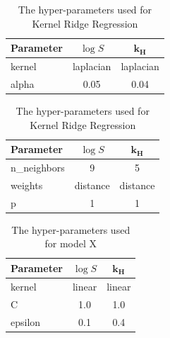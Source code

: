 \documentclass[11pt, titlepage]{article}
\begin{document}
\begin{table}[H]
	\begin{minipage}{.5\linewidth}
		\centering\small
		\begin{tabular}{|l|c|c|}
			\hline
			\textbf{Parameter} & $\log S$ & $\mathbf{k_H}$ \\
			\hline
			kernel & laplacian & laplacian\\
			alpha & 0.05 & 0.04\\
			\hline
		\end{tabular}
		\caption{The hyper-parameters used for Kernel Ridge Regression}
		\label{tab:KRR_params}
	\end{minipage}
	\begin{minipage}{.5\linewidth}
		\centering\small
		\begin{tabular}{|l|c|c|}
			\hline
			\textbf{Parameter} & $\log S$ & $\mathbf{k_H}$ \\
			\hline
			n\_neighbors & 9 & 5 \\
			weights & distance & distance \\
			p & 1 & 1\\
			\hline
		\end{tabular}
	\end{minipage}
\end{table}

\begin{table}[H]
	\centering\small
		\begin{tabular}{|l|c|c|}
			\hline
			\textbf{Parameter} & $\log S$ & $\mathbf{k_H}$ \\
			\hline
			kernel & linear & linear \\
			C & 1.0 & 1.0\\
			epsilon & 0.1 & 0.4 \\
			\hline
		\end{tabular}
		\caption{The hyper-parameters used for model X}
		\label{tab:SVR_params}
\end{table}
\end{document}
